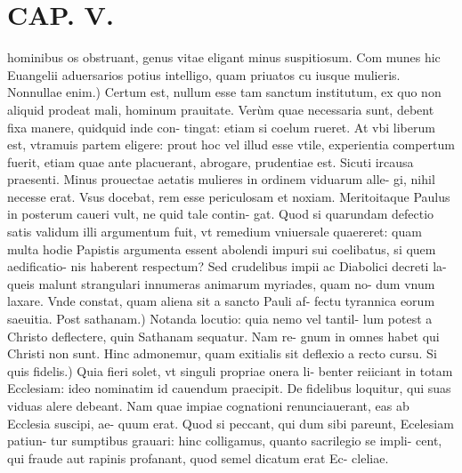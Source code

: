 \documentclass{article}
\begin{document}
\begin{pages}
\subsection*{\textit{}}
\section*{CAP. V. }
\marginpar{[ p.65 ]}\pstart hominibus os obstruant, genus vitae eligant minus suspitiosum. Com munes hic Euangelii aduersarios potius intelligo, quam priuatos cu iusque mulieris.  \pend\pstart Nonnullae enim.) Certum est, nullum esse tam sanctum institutum, ex quo non aliquid prodeat mali, hominum prauitate. Verùm quae necessaria sunt, debent fixa manere, quidquid inde con- tingat: etiam si coelum rueret. At vbi liberum est, vtramuis partem eligere: prout hoc vel illud esse vtile, experientia compertum fuerit, etiam quae ante placuerant, abrogare, prudentiae est. Sicuti ircausa praesenti. Minus prouectae aetatis mulieres in ordinem viduarum alle- gi, nihil necesse erat. Vsus docebat, rem esse periculosam et noxiam. Meritoitaque Paulus in posterum caueri vult, ne quid tale contin- gat. Quod si quarundam defectio satis validum illi argumentum fuit, vt remedium vniuersale quaereret: quam multa hodie Papistis argumenta essent abolendi impuri sui coelibatus, si quem aedificatio- nis haberent respectum? Sed crudelibus impii ac Diabolici decreti la- queis malunt strangulari innumeras animarum myriades, quam no- dum vnum laxare. Vnde constat, quam aliena sit a sancto Pauli af- fectu tyrannica eorum saeuitia.  \pend\pstart Post sathanam.) Notanda locutio: quia nemo vel tantil- lum potest a Christo deflectere, quin Sathanam sequatur. Nam re- gnum in omnes habet qui Christi non sunt. Hinc admonemur, quam exitialis sit deflexio a recto cursu.  \pend\pstart Si quis fidelis.) Quia fieri solet, vt singuli propriae onera li- benter reiiciant in totam Ecclesiam: ideo nominatim id cauendum praecipit. De fidelibus loquitur, qui suas viduas alere debeant. Nam quae impiae cognationi renunciauerant, eas ab Ecclesia suscipi, ae- quum erat. Quod si peccant, qui dum sibi pareunt, Ecelesiam patiun- tur sumptibus grauari: hinc colligamus, quanto sacrilegio se impli- cent, qui fraude aut rapinis profanant, quod semel dicatum erat Ec- cleliae.  \pend
{}
{}

\end{pages}
\end{document}
